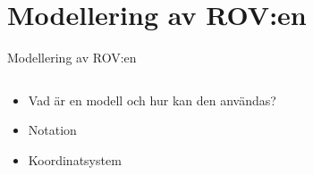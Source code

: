 \documentclass[11pt,aspectratio=169]{beamer}
\begin{document}
\section{Modellering av ROV:en}
\begin{frame}{Modellering av ROV:en}
\begin{columns}
\begin{column}{0.5\textwidth}
\begin{itemize}
\item {Vad är en modell och hur kan den användas?}
\item {Notation}
\item {Koordinatsystem}
\end{itemize}
\end{column}
\newcommand*{\coordinateRadius}{0.05}
\newcommand*{\coordRot}{30}
\begin{column}{0.5\textwidth}
\end{column}
\end{columns}
\end{frame}
\end{document}
